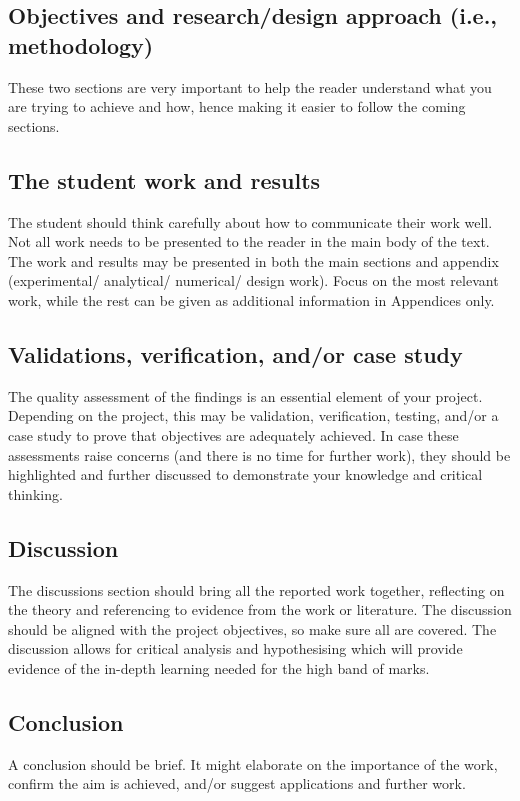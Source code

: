 \documentclass[11pt,a4paper]{article}
\begin{document}
\subsection{Objectives and research/design approach (i.e., methodology)}
These two sections are very important to help the reader understand what you are trying to achieve and how, hence making it easier to follow the coming sections.
\subsection{The student work and results}
The student should think carefully about how to communicate their work well. Not all work needs to be presented to the reader in the main body of the text. The work and results may be presented in both the main sections and appendix (experimental/ analytical/ numerical/ design work). Focus on the most relevant work, while the rest can be given as additional information in Appendices only.
\subsection{Validations, verification, and/or case study}
The quality assessment of the findings is an essential element of your project. Depending on the project, this may be validation, verification, testing, and/or a case study to prove that objectives are adequately achieved. In case these assessments raise concerns (and there is no time for further work), they should be highlighted and further discussed to demonstrate your knowledge and critical thinking.
\subsection{Discussion}
The discussions section should bring all the reported work together, reflecting on the theory and referencing to evidence from the work or literature. The discussion should be aligned with the project objectives, so make sure all are covered. The discussion allows for critical analysis and hypothesising which will provide evidence of the in-depth learning needed for the high band of marks.
\subsection{Conclusion}
A conclusion should be brief. It might elaborate on the importance of the work, confirm the aim is achieved, and/or suggest applications and further work.
\end{document}
